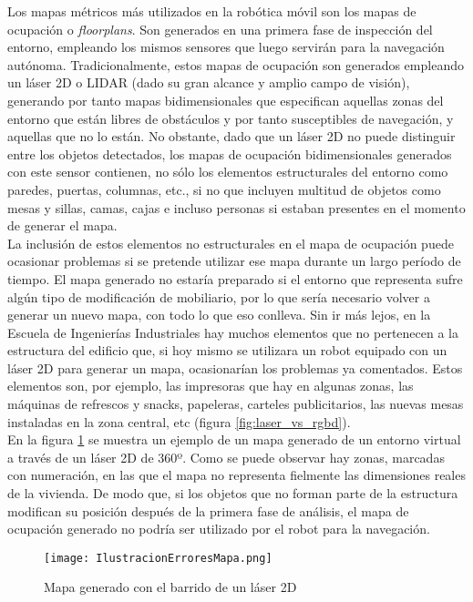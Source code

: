 Los mapas métricos más utilizados en la robótica móvil son los mapas de ocupación o \textit{floorplans}. Son generados en una primera fase de inspección del entorno, empleando los mismos sensores que luego servirán para la navegación autónoma. Tradicionalmente, estos mapas de ocupación son generados empleando un láser 2D o LIDAR (dado su gran alcance y amplio campo de visión), generando por tanto mapas bidimensionales que especifican aquellas zonas del entorno que están libres de obstáculos y por tanto susceptibles de navegación, y aquellas que no lo están. No obstante, dado que un láser 2D no puede distinguir entre los objetos detectados, los mapas de ocupación bidimensionales generados con este sensor contienen, no sólo los elementos estructurales del entorno como paredes, puertas, columnas, etc., si no que incluyen multitud de objetos como mesas y sillas, camas, cajas e incluso personas si estaban presentes en el momento de generar el mapa.\\

La inclusión de estos elementos no estructurales en el mapa de ocupación puede ocasionar problemas si se pretende utilizar ese mapa durante un largo período de tiempo. El mapa generado no estaría preparado si el entorno que representa sufre algún tipo de modificación de mobiliario, por lo que sería necesario volver a generar un nuevo mapa, con todo lo que eso conlleva. Sin ir más lejos, en la Escuela de Ingenierías Industriales hay muchos elementos que no pertenecen a la estructura del edificio que, si hoy mismo se utilizara un robot equipado con un láser 2D para generar un mapa, ocasionarían los problemas ya comentados. Estos elementos son, por ejemplo, las impresoras que hay en algunas zonas, las máquinas de refrescos y snacks, papeleras, carteles publicitarios, las nuevas mesas instaladas en la zona central, etc (figura \ref{fig:laser_vs_rgbd}).\\

En la figura \ref{fig:errores_laser} se muestra un ejemplo de un mapa generado de un entorno virtual a través de un láser 2D de 360º. Como se puede observar hay zonas, marcadas con numeración, en las que el mapa no representa fielmente las dimensiones reales de la vivienda. De modo que, si los objetos que no forman parte de la estructura modifican su posición después de la primera fase de análisis, el mapa de ocupación generado no podría ser utilizado por el robot para la navegación. \\

\begin{figure}[h]
	\begin{center} 
	\texttt{[image: IlustracionErroresMapa.png]}
	\end{center}
	\caption{Mapa generado con el barrido de un láser 2D}
	\label{fig:errores_laser}
\end{figure}

